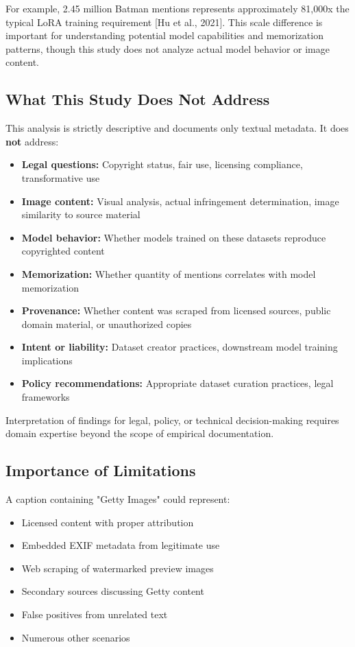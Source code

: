\documentclass[11pt]{article}
\begin{document}
For example, 2.45 million Batman mentions represents approximately 81,000x the typical LoRA training requirement [Hu et al., 2021]. This scale difference is important for understanding potential model capabilities and memorization patterns, though this study does not analyze actual model behavior or image content.


\subsection{What This Study Does Not Address}
This analysis is strictly descriptive and documents only textual metadata. It does \textbf{not} address:

\begin{itemize}

\item \textbf{Legal questions:} Copyright status, fair use, licensing compliance, transformative use
\item \textbf{Image content:} Visual analysis, actual infringement determination, image similarity to source material
\item \textbf{Model behavior:} Whether models trained on these datasets reproduce copyrighted content
\item \textbf{Memorization:} Whether quantity of mentions correlates with model memorization
\item \textbf{Provenance:} Whether content was scraped from licensed sources, public domain material, or unauthorized copies
\item \textbf{Intent or liability:} Dataset creator practices, downstream model training implications
\item \textbf{Policy recommendations:} Appropriate dataset curation practices, legal frameworks

\end{itemize}

Interpretation of findings for legal, policy, or technical decision-making requires domain expertise beyond the scope of empirical documentation.

\subsection{Importance of Limitations}
A caption containing "Getty Images" could represent:

\begin{itemize}

\item Licensed content with proper attribution
\item Embedded EXIF metadata from legitimate use
\item Web scraping of watermarked preview images
\item Secondary sources discussing Getty content
\item False positives from unrelated text
\item Numerous other scenarios

\end{itemize}
\end{document}
